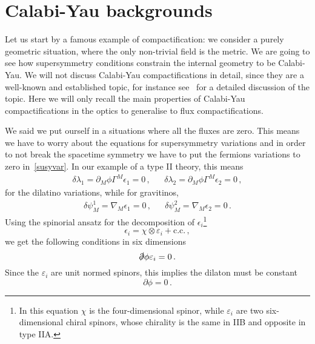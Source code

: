 \documentclass[debug]{phd}
\begin{document}
		\section{Calabi-Yau backgrounds}
				Let us start by a famous example of compactification: we consider a purely geometric situation, where the only non-trivial field is the metric.
				We are going to see how supersymmetry conditions constrain the internal geometry to be Calabi-Yau.
				We will not discuss Calabi-Yau compactifications in detail, since they are a well-known and established topic, for instance see~\cite{BlumLustThe} for a detailed discussion of the topic.
				Here we will only recall the main properties of Calabi-Yau compactifications in the optics to generalise to flux compactifications.
				
				We said we put ourself in a situations where all the fluxes are zero.
				This means we have to worry about the equations for supersymmetry variations and in order to not break the spacetime symmetry we have to put the fermions variations to zero in~\eqref{susyvar}.
				In our example of a type II theory, this means
						\begin{equation}
							\begin{array}{lcr}
								\delta \lambda_1 = \partial_M \phi \Gamma^M \epsilon_1 = 0 \, , & & \delta \lambda_2 = \partial_M \phi \Gamma^M \epsilon_2 = 0 \, ,
							\end{array}
						\end{equation}
				for the dilatino variations, while for gravitinos,
						\begin{equation}
							\begin{array}{lcr}
								\delta \psi^1_{M} = \nabla_M \epsilon_1 = 0 \, , & & \delta \psi^2_{M} = \nabla_M \epsilon_2 = 0 \, .
							\end{array}
						\end{equation}
				Using the spinorial ansatz for the decomposition of $\epsilon_i$\footnote{%
					In this equation $\chi$ is the four-dimensional spinor, while $\varepsilon_i$ are two six-dimensional chiral spinors, whose chirality is the same in IIB and opposite in type IIA.}
						\begin{equation}
							\epsilon_i = \chi \otimes \varepsilon_{i} + \text{c.c.} \, ,
						\end{equation}
				we get the following conditions in six dimensions
						\begin{equation}
							\slashed{\partial} \phi \varepsilon_i = 0 \, .
						\end{equation}
				Since the $\varepsilon_i$ are unit normed spinors, this implies the dilaton must be constant
						\begin{equation}
							\partial \phi = 0\, .
						\end{equation}
				
\end{document}
